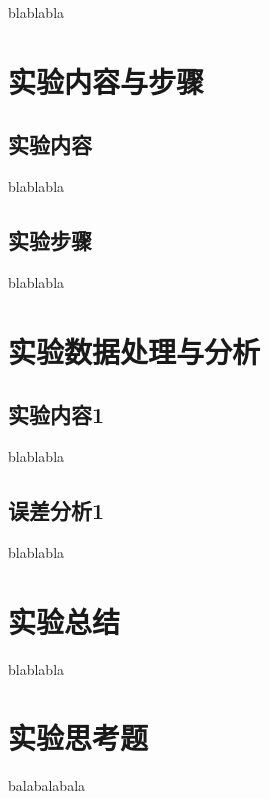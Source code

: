 \documentclass[a4paper,11pt,UTF8]{ctexart}
\begin{document}
blablabla

\section{实验内容与步骤}
\subsection{实验内容}
	blablabla
\subsection{实验步骤}
	blablabla

\section{实验数据处理与分析}
\subsection{实验内容1}
	blablabla
\subsection{误差分析1}
	blablabla

\section{实验总结}
blablabla
\section{实验思考题}
balabalabala
\end{document}
